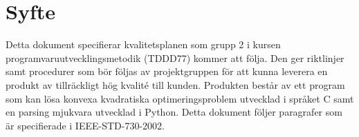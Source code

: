 \section{Syfte}
Detta dokument specifierar kvalitetsplanen som grupp 2 i kursen programvaruutvecklingsmetodik (TDDD77) kommer att följa. Den ger riktlinjer samt procedurer som bör följas av projektgruppen för att kunna leverera en produkt av tillräckligt hög kvalité till kunden. Produkten består av ett program som kan lösa konvexa kvadratiska optimeringsproblem utvecklad i språket C samt en parsing mjukvara utvecklad i Python. Detta dokument följer paragrafer som är specifierade i IEEE-STD-730-2002.